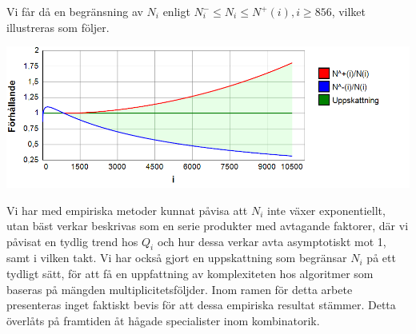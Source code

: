 Vi får då en begränsning av $N_i$ enligt $N^-_i \leq N_i \leq N^+(i), i\geq 856$, vilket illustreras som följer.

\begin{center}
\includegraphics[scale=0.5]{Export/Complexity20.png}
\end{center}

Vi har med empiriska metoder kunnat påvisa att $N_i$ inte växer exponentiellt, utan bäst verkar beskrivas som en serie produkter med avtagande faktorer, där vi påvisat en tydlig trend hos $Q_i$ och hur dessa verkar avta asymptotiskt mot 1, samt i vilken takt. Vi har också gjort en uppskattning som begränsar $N_i$ på ett tydligt sätt, för att få en uppfattning av komplexiteten hos algoritmer som baseras på mängden multiplicitetsföljder. Inom ramen för detta arbete presenteras inget faktiskt bevis för att dessa empiriska resultat stämmer. Detta överlåts på framtiden åt hågade specialister inom kombinatorik.